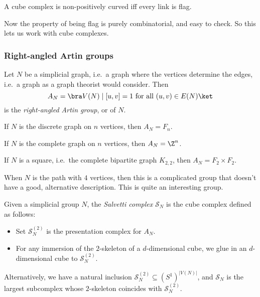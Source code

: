 \documentclass[a4paper]{article}
\begin{document}
\begin{thm}[Gromov]
  A cube complex is non-positively curved iff every link is flag.
\end{thm}
Now the property of being flag is purely combinatorial, and easy to check. So this lets us work with cube complexes.

\subsubsection*{Right-angled Artin groups}
\begin{defi}
  Let $N$ be a simplicial graph, i.e.\ a graph where the vertices determine the edges, i.e.\ a graph as a graph theorist would consider. Then
  \[
    A_N = \bra V(N) \mid [u, v] = 1 \text{ for all } (u, v) \in E(N)\ket
  \]
  is the \emph{right-angled Artin group}, or  of $N$.
\end{defi}

\begin{eg}
  If $N$ is the discrete graph on $n$ vertices, then $A_N = F_n$.
\end{eg}

\begin{eg}
  If $N$ is the complete graph on $n$ vertices, then $A_N = \Z^n$.
\end{eg}

\begin{eg}
  If $N$ is a square, i.e.\ the complete bipartite graph $K_{2, 2}$, then $A_N = F_2 \times F_2$.
\end{eg}

\begin{eg}
  When $N$ is the path with $4$ vertices, then this is a complicated group that doesn't have a good, alternative description. This is quite an interesting group.
\end{eg}

\begin{defi}
  Given a simplicial group $N$, the \emph{Salvetti complex} $\mathcal{S}_N$ is the cube complex defined as follows:
  \begin{itemize}
    \item Set $\mathcal{S}_N^{(2)}$ is the presentation complex for $A_N$.
    \item For any immersion of the $2$-skeleton of a $d$-dimensional cube, we glue in an $d$-dimensional cube to $\mathcal{S}_N^{(2)}$.
  \end{itemize}
  Alternatively, we have a natural inclusion $\mathcal{S}_N^{(2)} \subseteq (S^1)^{|V(N)|}$, and $\mathcal{S}_N$ is the largest subcomplex whose $2$-skeleton coincides with $\mathcal{S}_N^{(2)}$.
\end{defi}
\end{document}
